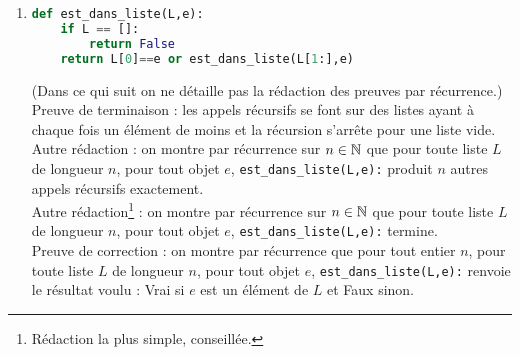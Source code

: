\documentclass[11pt,a4paper]{article}
\begin{document}
\begin{enumerate}
\item 
\begin{lstlisting}[language=Python]
def est_dans_liste(L,e):
	if L == []:
		return False
	return L[0]==e or est_dans_liste(L[1:],e)
\end{lstlisting}
(Dans ce qui suit on ne détaille pas la rédaction des preuves par récurrence.)\\

Preuve de terminaison : les appels récursifs se font sur des listes ayant à chaque fois un élément de moins et la récursion s'arrête pour une liste vide.\\
Autre rédaction : on montre par récurrence sur $n\in\mathbb{N}$ que pour toute liste $L$ de longueur $n$, pour tout objet $e$, \verb+est_dans_liste(L,e):+ produit $n$ autres appels récursifs exactement.\\
Autre rédaction\footnote{Rédaction la plus simple, conseillée.} : on montre par récurrence sur $n\in\mathbb{N}$ que pour toute liste $L$ de longueur $n$, pour tout objet $e$, \verb+est_dans_liste(L,e):+ termine.\\
Preuve de correction : on montre par récurrence que pour tout entier $n$, pour toute liste $L$ de longueur $n$, pour tout objet $e$, \verb+est_dans_liste(L,e):+ renvoie le résultat voulu : Vrai si $e$ est un élément de $L$ et Faux sinon.\\


\end{enumerate}
\end{document}

